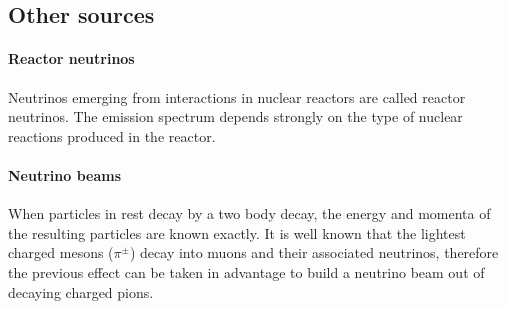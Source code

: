 \subsection{Other sources}

\paragraph{Reactor neutrinos} Neutrinos emerging from interactions in nuclear reactors are called reactor neutrinos.
The emission spectrum depends strongly on the type of nuclear reactions produced in the reactor.

\paragraph{Neutrino beams} When particles in rest decay by a two body decay, the energy and momenta of the resulting particles are known exactly.
It is well known that the lightest charged mesons ($\pi^\pm$) decay into muons and their associated neutrinos, therefore the previous effect can be taken in advantage to build a neutrino beam out of decaying charged pions.

